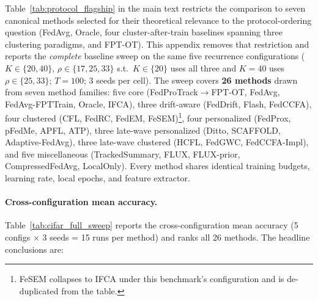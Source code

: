 Table~\ref{tab:protocol_flagship} in the main text restricts the comparison to seven canonical methods selected for their theoretical relevance to the protocol-ordering question (FedAvg, Oracle, four cluster-after-train baselines spanning three clustering paradigms, and FPT-OT). This appendix removes that restriction and reports the \emph{complete} baseline sweep on the same five recurrence configurations ($K \in \{20, 40\}$, $\rho \in \{17, 25, 33\}$ s.t.\ $K \in \{20\}$ uses all three and $K{=}40$ uses $\rho \in \{25, 33\}$; $T=100$; 3 seeds per cell). The sweep covers \textbf{26 methods} drawn from seven method families: five core (FedProTrack$\to$FPT-OT, FedAvg, FedAvg-FPTTrain, Oracle, IFCA), three drift-aware (FedDrift, Flash, FedCCFA), four clustered (CFL, FedRC, FedEM, FeSEM)\footnote{FeSEM collapses to IFCA under this benchmark's configuration and is de-duplicated from the table.}, four personalized (FedProx, pFedMe, APFL, ATP), three late-wave personalized (Ditto, SCAFFOLD, Adaptive-FedAvg), three late-wave clustered (HCFL, FedGWC, FedCCFA-Impl), and five miscellaneous (TrackedSummary, FLUX, FLUX-prior, CompressedFedAvg, LocalOnly). Every method shares identical training budgets, learning rate, local epochs, and feature extractor.

\paragraph{Cross-configuration mean accuracy.}
Table~\ref{tab:cifar_full_sweep} reports the cross-configuration mean accuracy (5 configs $\times$ 3 seeds = 15 runs per method) and ranks all 26 methods. The headline conclusions are:

